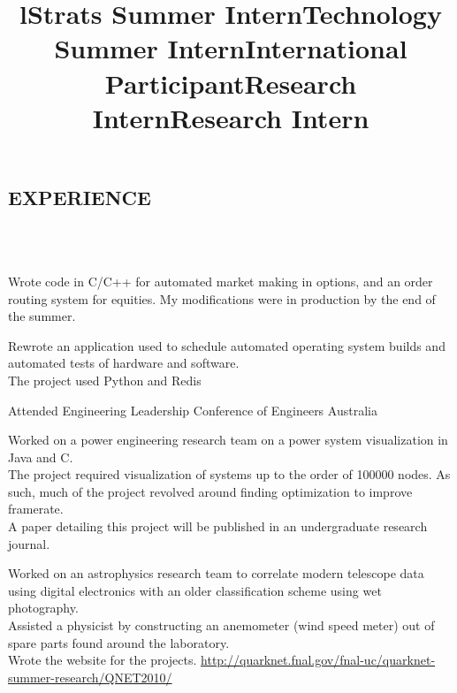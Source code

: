 \documentclass{res}
\begin{document}
\begin{resume}
\section{EXPERIENCE}
\begin{format}
  \title{l}  \\
  \body\\
\end{format}

\title{\bf Strats Summer Intern}
\begin{position}
     Wrote code in C/C++ for automated market making in options, and an order routing system for equities. My modifications were in production by the end of the summer.
\end{position}

\title{\bf Technology Summer Intern}
\begin{position}
     Rewrote an application used to schedule automated operating system builds and automated tests of hardware and software.\\
     The project used Python and Redis
\end{position}

\title{\bf International Participant}
\begin{position}
  Attended Engineering Leadership Conference of Engineers Australia
\end{position}

\title{\bf Research Intern}
\begin{position}
     Worked on a power engineering research team on a power system visualization in Java and C.\\
     The project required visualization of systems up to the order of 100000 nodes. As such, much of the project revolved around finding optimization to improve framerate.\\
     A paper detailing this project will be published in an undergraduate research journal.
\end{position}

\title{\bf Research Intern}
\begin{position}
      Worked on an astrophysics research team to correlate modern telescope data using digital electronics with an older classification scheme using wet photography.\\
      Assisted a physicist by constructing an anemometer (wind speed meter) out of spare parts found around the laboratory.\\
      Wrote the website for the projects. \url{http://quarknet.fnal.gov/fnal-uc/quarknet-summer-research/QNET2010/}
\end{position}


\end{resume}
\end{document}
